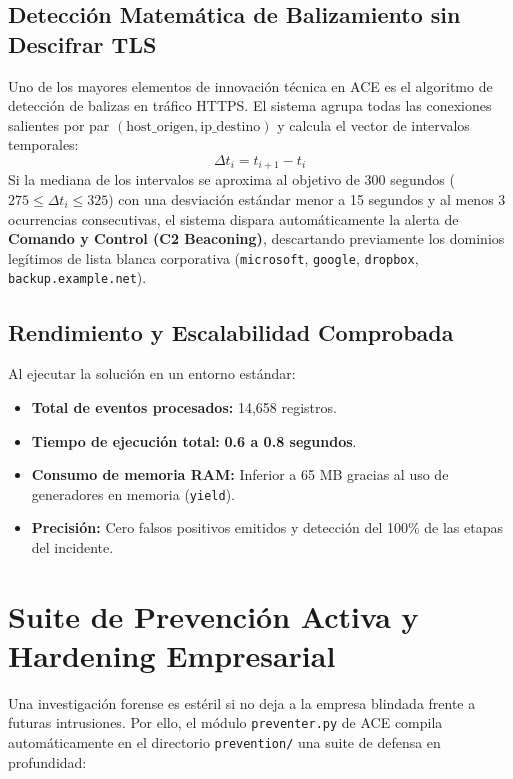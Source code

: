 \documentclass[11pt,a4paper]{article}
\begin{document}
\subsection{Detección Matemática de Balizamiento sin Descifrar TLS}
Uno de los mayores elementos de innovación técnica en ACE es el algoritmo de detección de balizas en tráfico HTTPS. El sistema agrupa todas las conexiones salientes por par $(\text{host\_origen}, \text{ip\_destino})$ y calcula el vector de intervalos temporales:
$$\Delta t_i = t_{i+1} - t_i$$
Si la mediana de los intervalos se aproxima al objetivo de 300 segundos ($275 \le \Delta t_i \le 325$) con una desviación estándar menor a 15 segundos y al menos 3 ocurrencias consecutivas, el sistema dispara automáticamente la alerta de \textbf{Comando y Control (C2 Beaconing)}, descartando previamente los dominios legítimos de lista blanca corporativa (\texttt{microsoft}, \texttt{google}, \texttt{dropbox}, \texttt{backup.example.net}).

\subsection{Rendimiento y Escalabilidad Comprobada}
Al ejecutar la solución en un entorno estándar:
\begin{itemize}[noitemsep]
    \item \textbf{Total de eventos procesados:} 14,658 registros.
    \item \textbf{Tiempo de ejecución total:} \textbf{0.6 a 0.8 segundos}.
    \item \textbf{Consumo de memoria RAM:} Inferior a 65 MB gracias al uso de generadores en memoria (\texttt{yield}).
    \item \textbf{Precisión:} Cero falsos positivos emitidos y detección del 100\% de las etapas del incidente.
\end{itemize}

\section{Suite de Prevención Activa y Hardening Empresarial}

Una investigación forense es estéril si no deja a la empresa blindada frente a futuras intrusiones. Por ello, el módulo \texttt{preventer.py} de ACE compila automáticamente en el directorio \texttt{prevention/} una suite de defensa en profundidad:
\end{document}
